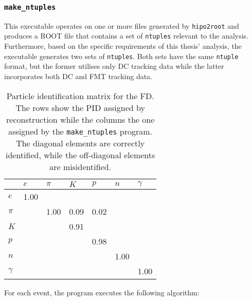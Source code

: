 \subsubsection{\texttt{make\_ntuples}}
\label{sssec::make_ntuples}
    This executable operates on one or more files generated by \texttt{hipo2root} and produces a ROOT file that contains a set of \texttt{ntuples} relevant to the analysis.
    Furthermore, based on the specific requirements of this thesis' analysis, the executable generates two sets of \texttt{ntuples}.
    Both sets have the same \texttt{ntuple} format, but the former utilises only DC tracking data while the latter incorporates both DC and FMT tracking data.

    \begin{table}
        \caption{Particle identification matrix for the FD.
        The rows show the PID assigned by reconstruction while the columns the one assigned by the \texttt{make\_ntuples} program.
        The diagonal elements are correctly identified, while the off-diagonal elements are misidentified.}

        \begin{center}
            \begin{tabularx}{240pt}{X|llllll}
                \cline{2-7}
                         & $e$      & $\pi$ & $K$  & $p$  & $n$  & $\gamma$ \\
                \hline
                $e$      & 1.00     &       &      &      &      &          \\
                $\pi$    &          & 1.00  & 0.09 & 0.02 &      &          \\
                $K$      &          &       & 0.91 &      &      &          \\
                $p$      &          &       &      & 0.98 &      &          \\
                $n$      &          &       &      &      & 1.00 &          \\
                $\gamma$ &          &       &      &      &      & 1.00     \\
                \hline
            \end{tabularx}
        \end{center}
        \label{tab::mpid}
    \end{table}

    For each event, the program executes the following algorithm:

